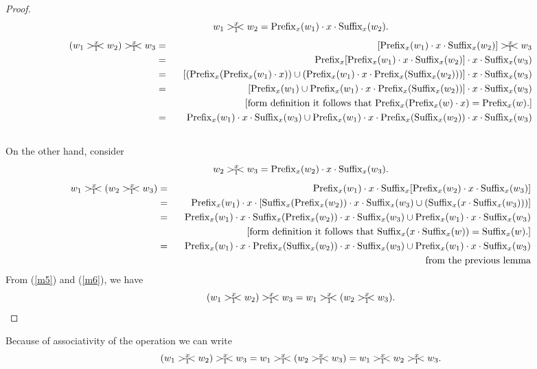 \documentclass{llncs}
\newcommand{\cd}{\cdot}
\newcommand{\p}{\mathrm{Prefix}}
\newcommand{\s}{\mathrm{Suffix}}
\newcommand{\rs}{\hspace{-3.5mm}-\hspace{-2mm}<}
\begin{document}
\begin{proof}
\begin{equation*}
w_1>_1^x\rs w_2=\p_x(w_1)\cd x\cd\s_x(w_2).
\end{equation*}
\begin{eqnarray}\label{m5}
(w_1>_1^x\rs w_2)>_1^x\rs w_3 &=& [\p_x(w_1)\cd x\cd\s_x(w_2)]>_1^x\rs w_3\nonumber\\
    &=& \p_x[\p_x(w_1)\cd x\cd\s_x(w_2)]\cd x\cd \s_x(w_3)\nonumber \\
    &=& [(\p_x(\p_x(w_1)\cdot x))\cup
    (\p_x(w_1)\cd x\cd\p_x(\s_x(w_2)))]\cd x\cd \s_x(w_3)\nonumber\\
    &=& [\p_x(w_1)\cup \p_x(w_1)\cd x\cd\p_x(\s_x(w_2))]\cd x\cd \s_x(w_3)\nonumber\\
    && \hspace{1in}[\mbox{form definition it follows that $\p_x(\p_x(w)\cd x)=\p_x(w)$.}]\nonumber\\
    &=& \p_x(w_1)\cd x\cd \s_x(w_3)\cup\p_x(w_1)\cd x\cd\p_x(\s_x(w_2))\cd x\cd \s_x(w_3)\nonumber\\
    &&
\end{eqnarray}
On the other hand, consider
\[w_2>_1^x\rs w_3=\p_x(w_2)\cd x\cd \s_x(w_3).\]
\begin{eqnarray}\label{m6}
w_1>_1^x\rs (w_2>_1^x\rs w_3) &=& \p_x(w_1)\cd x\cd\s_x[\p_x(w_2)\cd x\cd \s_x(w_3)]\nonumber\\
    &=& \p_x(w_1)\cd x\cd[\s_x(\p_x(w_2))\cd x\cd \s_x(w_3)\cup(\s_x(x\cdot\s_x(w_3)))]\nonumber \\
    &=& \p_x(w_1)\cd x\cd \s_x(\p_x(w_2))\cd x\cd\s_x(w_3)\cup\p_x(w_1)\cd x\cd \s_x(w_3)\nonumber\\
    && \hspace{1in}[\mbox{form definition it follows that $\s_x(x\cd\s_x(w))=\s_x(w)$.}]\nonumber\\
    &=& \p_x(w_1)\cd x\cd \p_x(\s_x(w_2))\cd x\cd\s_x(w_3)\cup\p_x(w_1)\cd x\cd \s_x(w_3)\nonumber \\
    &&\hspace{1in}\mbox{from the previous lemma}
\end{eqnarray}
From (\ref{m5}) and (\ref{m6}), we have
\[(w_1>_1^x\rs w_2)>_1^x\rs w_3=w_1>_1^x\rs (w_2>_1^x\rs w_3). \]
\end{proof}
\begin{note}
Because of associativity of the operation we can write
\[ (w_1>_1^x\rs w_2)>_1^x\rs w_3=w_1>_1^x\rs (w_2>_1^x\rs w_3)=w_1>_1^x\rs w_2>_1^x\rs w_3.\]
\end{note}
\end{document}
